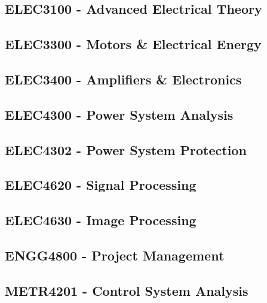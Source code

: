 \subsection{ELEC3100 - Advanced Electrical Theory}
\clearpage

\subsection{ELEC3300 - Motors \& Electrical Energy}
\clearpage

\subsection{ELEC3400 - Amplifiers \& Electronics}
\clearpage

\subsection{ELEC4300 - Power System Analysis}
\clearpage

\subsection{ELEC4302 - Power System Protection}
\clearpage

\subsection{ELEC4620 - Signal Processing}
\clearpage

\subsection{ELEC4630 - Image Processing}
\clearpage

\subsection{ENGG4800 - Project Management}
\clearpage

\subsection{METR4201 - Control System Analysis}
\clearpage





